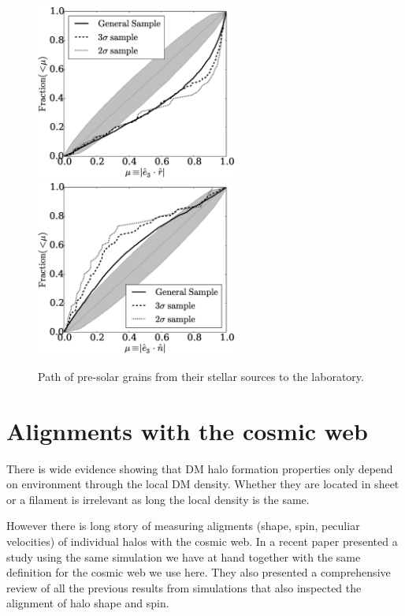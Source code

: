 \documentclass{iau}
\begin{document}
\begin{figure}[b]
\begin{center}
 \includegraphics[width=2.6in]{alignments_e3_r_all_environments.eps} 
 \includegraphics[width=2.6in]{alignments_e3_n_all_environments.eps} 
 \caption{Path of pre-solar grains from their stellar sources to the laboratory.}
   \label{fig1}
\end{center}
\end{figure}



\section{Alignments with the cosmic web}

There is wide evidence showing that DM halo formation properties only
depend on environment through the local DM density. Whether they are
located in sheet or a filament is irrelevant as long the local density
is the same. 

However there is long story of measuring aligments (shape, spin,
peculiar velocities) of individual halos with the cosmic web. In a
recent paper \cite{ForeroRomero2014} presented a study
using the same simulation we have at hand together with the same
definition for the cosmic web we use here. They also presented a comprehensive
review of all the previous results from simulations that also
inspected the alignment of halo shape and spin. 
\end{document}
